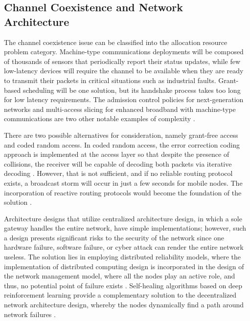 \documentclass[a4paper,fleqn]{cas-dc}
\numberwithin{equation}{section}
\begin{document}
\subsection{Channel Coexistence and Network Architecture}

The channel coexistence issue can be classified into the allocation resource problem category. Machine-type communications deployments will be composed of thousands of sensors that periodically report their status updates, while few low-latency devices will require the channel to be available when they are ready to transmit their packets in critical situations such as industrial faults. Grant-based scheduling will be one solution, but its handshake process takes too long for low latency requirements. The admission control policies for next-generation networks and multi-access slicing for enhanced broadband with machine-type communications are two other notable examples of complexity \cite{Ginige_2025_AdmissionControl, Popovski_2024_Slicing}.

There are two possible alternatives for consideration, namely grant-free access and coded random access. In coded random access, the error correction coding approach is implemented at the access layer so that despite the presence of collisions, the receiver will be capable of decoding both packets via iterative decoding \cite{b5}. However, that is not sufficient, and if no reliable routing protocol exists, a broadcast storm will occur in just a few seconds for mobile nodes. The incorporation of reactive routing protocols would become the foundation of the solution \cite{Lin_2024_Reinforcement, Gholizadeh_2024_DRL_Reconfig}.

Architecture designs that utilize centralized architecture design, in which a sole gateway handles the entire network, have simple implementations; however, such a design presents significant risks to the security of the network since one hardware failure, software failure, or cyber attack can render the entire network useless. The solution lies in employing distributed reliability models, where the implementation of distributed computing design is incorporated in the design of the network management model, where all the nodes play an active role, and thus, no potential point of failure exists \cite{b3}. Self-healing algorithms based on deep reinforcement learning provide a complementary solution to the decentralized network architecture design, whereby the nodes dynamically find a path around network failures \cite{Wang_2025_DRL_SelfHealing}.
\end{document}
